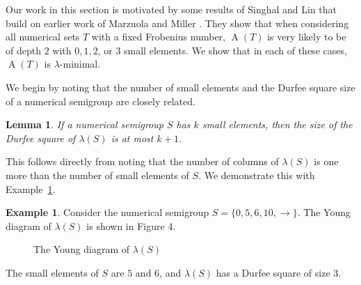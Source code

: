 \documentclass{amsproc}
\DeclareMathOperator{\A}{A}
\newtheorem{lemma}[theorem]{Lemma}
\theoremstyle{definition}
\newtheorem{example}[theorem]{Example}
\theoremstyle{remark}
\numberwithin{equation}{section}
\begin{document}
Our work in this section is motivated by some results of Singhal and Lin \cite{doi:10.1080/00927872.2021.1918136} that build on earlier work of Marzuola and Miller \cite{MarzuolaMiller}. They show that when considering all numerical sets $T$ with a fixed Frobenius number, $\A(T)$ is very likely to be of depth $2$ with $0,1,2$, or $3$ small elements. We show that in each of these cases, $\A(T)$ is $\lambda$-minimal. 

We begin by noting that the number of small elements and the Durfee square size of a numerical semigroup are closely related. 
\begin{lemma}\label{small to durfee lem}
    If a numerical semigroup $S$ has $k$ small elements, then the size of the Durfee square of $\lambda(S)$ is at most $k+1$. 
\end{lemma}
This follows directly from noting that the number of columns of $\lambda(S)$ is one more than the number of small elements of $S$. 
We demonstrate this with Example~\ref{small ele to durfee}.
\begin{example}
    \label{small ele to durfee}
    Consider the numerical semigroup $S=\{0,5,6,10,\rightarrow\}$. The Young diagram of $\lambda(S)$ is shown in Figure 4.
    \begin{figure}[H]\label{fig:Young}
\caption{The Young diagram of $\lambda(S)$}
    \end{figure}
\noindent The small elements of $S$ are $5$ and $6$, and $\lambda(S)$ has a Durfee square of size $3$. 
\end{example}
\end{document}
